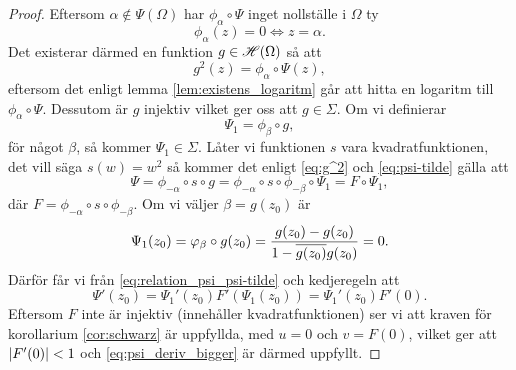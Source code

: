 \begin{proof}
	Eftersom $\alpha \notin \Psi(\Omega)$ har $\phi_{\alpha} \circ \Psi$ inget nollställe i $\Omega$ ty
	\begin{equation*}
		\phi_{\alpha}(z) = 0 \iff z = \alpha.
	\end{equation*}
	Det existerar därmed en funktion $g \in \mathscr{H}(\Omega)$ så att
	\begin{equation} \label{eq:g^2}
		g^2(z) = \phi_{\alpha} \circ \Psi(z),
	\end{equation}
	eftersom det enligt lemma \ref{lem:existens_logaritm} går att hitta en logaritm till $\phi_{\alpha} \circ \Psi$.  Dessutom är $g$ injektiv vilket ger oss att $g \in \Sigma$. Om vi definierar
	\begin{equation} \label{eq:psi-tilde}
		\Psi_1 = \phi_{\beta} \circ g,
	\end{equation}
	för något $\beta$, så kommer $\Psi_1 \in \Sigma$. Låter vi funktionen $s$ vara kvadratfunktionen, det vill säga $s(w) = w^2$ så kommer det enligt \eqref{eq:g^2} och \eqref{eq:psi-tilde} gälla att
	\begin{equation}\label{eq:relation_psi_psi-tilde}
		\Psi = \phi_{-\alpha} \circ s\circ g =\phi_{-\alpha} \circ s \circ \phi_{-\beta} \circ \Psi_1 = F \circ \Psi_1,
	\end{equation}
	där $F =\phi_{-\alpha} \circ s \circ \phi_{-\beta}$.
	Om vi väljer $\beta = g(z_0)$ är
	\begin{equation*}
		\Psi_1(z_0) = \varphi_{\beta} \circ g(z_0) = \frac{g(z_0) - g(z_0)}{1- \overline{g(z_0)}g(z_0)} = 0.
	\end{equation*}
	Därför får vi från \eqref{eq:relation_psi_psi-tilde} och kedjeregeln att
	\begin{equation*}
		\Psi'(z_0) = \Psi_1'(z_0)F'(\Psi_1(z_0))  = \Psi_1'(z_0)F'(0).
	\end{equation*}
	Eftersom $F$ inte är injektiv (innehåller kvadratfunktionen) ser vi att kraven för korollarium \ref{cor:schwarz} är uppfyllda, med $u = 0$ och $v=F(0)$, vilket ger att $\left\lvert F'(0) \right\rvert < 1$ och \eqref{eq:psi_deriv_bigger} är därmed uppfyllt.


\end{proof}
